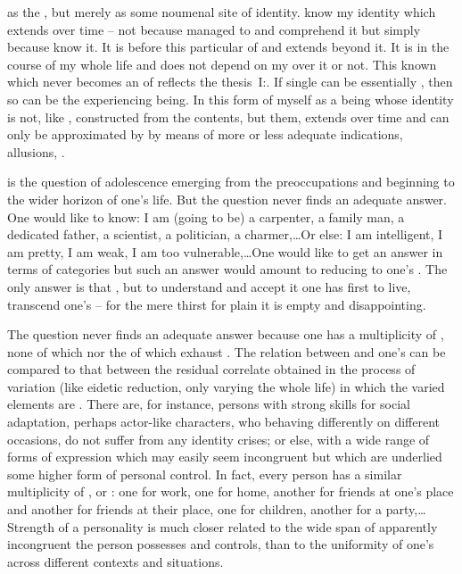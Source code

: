    as  the \hoa, but merely as
some noumenal site of identity.   know my identity which extends over time
-- not because  managed to  and {comprehend} it but
simply because  know it. It is  before this particular
 of  and extends beyond it. It is  in the
course of my whole life and does not depend on my  over it or not.
This known  which never becomes an  of 
reflects the thesis~I:. If single  can be
essentially , then so can be the experiencing being. In this form
of    myself as a being whose identity is
not, like , constructed from the  contents, but
 them, extends over time and can only be approximated by
 by means of more or less adequate indications, allusions,
.
%


\pa
{} is the question of adolescence emerging from the
 preoccupations and beginning to  the wider horizon of one's
life. But the question never finds an adequate answer. One would like to know: I
am (going to be) a carpenter, a family man, a dedicated father, a scientist, a
politician, a charmer,\ldots Or else: I am intelligent, I am pretty, I am weak, I am
too vulnerable,\dots One would like to get an answer in terms of  categories but such an answer would amount to reducing  to
one's . The only answer is that , but to understand and
accept it one has first to live, transcend one's  -- for the mere
 thirst for plain  it is empty and disappointing.  

The question never finds an adequate answer because one has a multiplicity of
, none of which nor the  of which exhaust . 
The relation between  and one's  can 
be compared to that between the residual correlate obtained in the process of
variation (like eidetic reduction, only varying the whole life) in which the
varied elements are . There are, for instance, persons with strong
skills for social adaptation, perhaps actor-like characters, who behaving
differently on different occasions, do not suffer from any identity crises; or
else,  with a wide range of forms of expression
which may easily seem incongruent but which are underlied some higher form of
personal control. In fact, every person has a similar multiplicity of , or
: one for work, one for home, another for friends at one's place
and another for friends at their place, one for children, another for a
party,\ldots Strength of a personality is much closer related to the wide span of
apparently incongruent  the person possesses and controls, than to the
uniformity of one's  across different contexts and situations.


